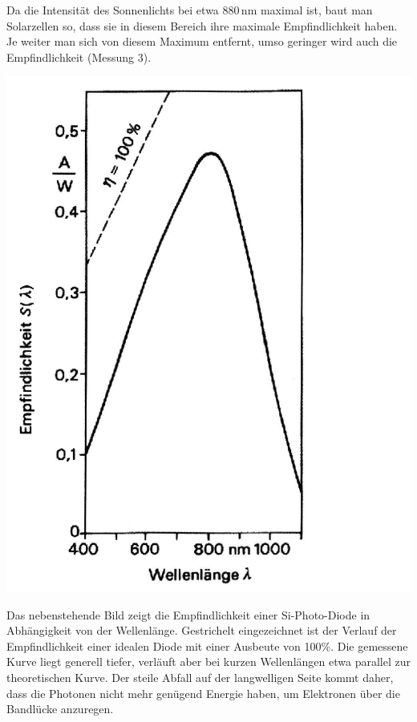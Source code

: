 \noindent
Da die Intensität des Sonnenlichts bei etwa 880\,nm maximal ist, baut man Solarzellen so, dass sie in diesem Bereich ihre maximale Empfindlichkeit haben. Je weiter man sich von diesem Maximum entfernt, umso geringer wird auch die Empfindlichkeit (Messung 3).

\begin{minipage}{0.5\textwidth}
	\includegraphics[width=1.00\textwidth]{Abbildungen/QE_Solarzelle.JPG}
	\label{fig:BILD17}
\end{minipage}
\begin{minipage}{0.5\textwidth}
Das nebenstehende Bild zeigt die Empfindlichkeit einer Si-Photo-Diode in Abhängigkeit von der Wellenlänge. Gestrichelt eingezeichnet ist der Verlauf der Empfindlichkeit einer idealen Diode mit einer Ausbeute von 100\%.
Die gemessene Kurve liegt generell tiefer, verläuft aber bei kurzen Wellenlängen etwa parallel zur theoretischen Kurve.
Der steile Abfall auf der langwelligen Seite kommt daher, dass die Photonen nicht mehr genügend Energie haben, um Elektronen über die Bandlücke anzuregen.
\end{minipage}